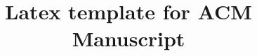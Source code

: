 \documentclass[sigconf,authorversion,nonacm]{acmart}  %
\begin{document}
\title{Latex template for ACM Manuscript}

% 




\maketitle

















\footnotesize




\end{document}

